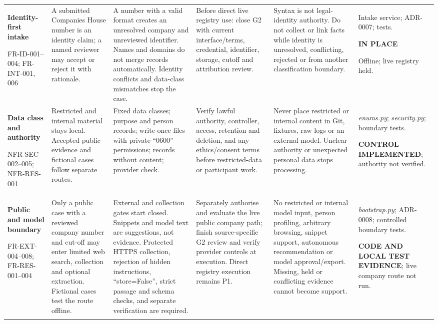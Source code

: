 \begin{longtable}{@{}P{0.125\textwidth}P{0.135\textwidth}P{0.20\textwidth}P{0.16\textwidth}P{0.18\textwidth}P{0.15\textwidth}@{}}
    \addlinespace[1.5pt]
    \textbf{Identity-first intake}\par FR-ID-001--004; FR-INT-001, 006 &
    A submitted Companies House number is an identity claim; a named reviewer may accept or reject it with rationale. &
    A number with a valid format creates an unresolved company and unreviewed identifier. Names and domains do not merge records automatically. Identity conflicts and data-class mismatches stop the case. &
    Before direct live registry use: close G2 with current interface/terms, credential, identifier, storage, cutoff and attribution review. &
    Syntax is not legal-identity authority. Do not collect or link facts while identity is unresolved, conflicting, rejected or from another classification boundary. &
    Intake service; ADR-0007; tests.\par \textbf{IN PLACE}\par Offline; live registry held. \\

    \addlinespace[1.5pt]
    \textbf{Data class and authority}\par NFR-SEC-002--005; NFR-RES-001 &
    Restricted and internal material stays local. Accepted public evidence and fictional cases follow separate routes. &
    Fixed data classes; purpose and person records; write-once files with private ``0600'' permissions; records without content; provider check. &
    Verify lawful authority, controller, access, retention and deletion, and any ethics/consent terms before restricted-data or participant work. &
    Never place restricted or internal content in Git, fixtures, raw logs or an external model. Unclear authority or unexpected personal data stops processing. &
    \emph{enums.py}; \emph{security.py}; boundary tests.\par \textbf{CONTROL IMPLEMENTED}; authority not verified. \\

    \addlinespace[1.5pt]
    \textbf{Public and model boundary}\par FR-EXT-004--008; FR-RES-001--004 &
    Only a public case with a reviewed company number and cut-off may enter limited web search, collection and optional extraction. Fictional cases test the route offline. &
    External and collection gates start closed. Snippets and model text are suggestions, not evidence. Protected HTTPS collection, rejection of hidden instructions, ``store=False'', strict passage and schema checks, and separate verification are required. &
    Separately authorise and evaluate the live public company path; finish source-specific G2 review and verify provider controls at execution. Direct registry execution remains P1. &
    No restricted or internal model input, person profiling, arbitrary browsing, snippet support, autonomous recommendation or model approval/export. Missing, held or conflicting evidence cannot become support. &
    \emph{bootstrap.py}; ADR-0008; controlled boundary tests.\par \textbf{CODE AND LOCAL TEST EVIDENCE}; live company route not run. \\
    \pagebreak


\end{longtable}
